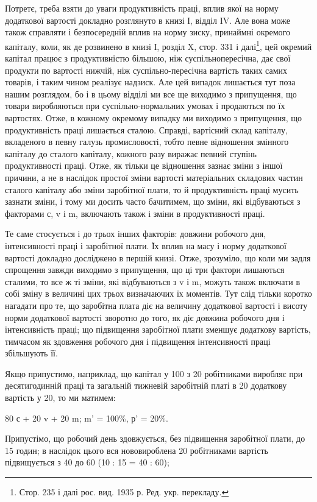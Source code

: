 Потретє, треба взяти до уваги продуктивність праці, вплив
якої на норму додаткової вартості докладно розглянуто в книзі І,
відділ IV. Але вона може також справляти і безпосередній
вплив на норму зиску, принаймні окремого капіталу, коли, як
де розвинено в книзі І, розділ X, стор. 331 і далі\footnote*{
Стор. 235 і далі рос. вид. 1935 р. Ред. укр. перекладу.
}, цей окремий
капітал працює з продуктивністю більшою, ніж суспільнопересічна,
дає свої продукти по вартості нижчій, ніж суспільно-пересічна
вартість таких самих товарів, і таким чином
реалізує надзиск. Але цей випадок лишається тут поза нашим
розглядом, бо і в цьому відділі ми все ще виходимо з припущення,
що товари виробляються при суспільно-нормальних
умовах і продаються по їх вартостях. Отже, в кожному окремому
випадку ми виходимо з припущення, що продуктивність
праці лишається сталою. Справді, вартісний склад капіталу,
вкладеного в певну галузь промисловості, тобто певне відношення
змінного капіталу до сталого капіталу, кожного разу
виражає певний ступінь продуктивності праці. Отже, як тільки
це відношення зазнає зміни з іншої причини, а не в наслідок
простої зміни вартості матеріальних складових частин сталого
капіталу або зміни заробітної плати, то й продуктивність праці
мусить зазнати зміни, і тому ми досить часто бачитимем, що
зміни, які відбуваються з факторами с, v і m, включають також
і зміни в продуктивності праці.

Те саме стосується і до трьох інших факторів: довжини робочого
дня, інтенсивності праці і заробітної плати. Їх вплив
на масу і норму додаткової вартості докладно досліджено в першій
книзі. Отже, зрозуміло, що коли ми задля спрощення завжди
виходимо з припущення, що ці три фактори лишаються сталими,
то все ж ті зміни, які відбуваються з v і m, можуть також включати
в собі зміну в величині цих трьох визначаючих їх моментів.
Тут слід тільки коротко нагадати про те, що заробітна плата
діє на величину додаткової вартості і висоту норми додаткової
вартості зворотно до того, як діє довжина робочого дня і інтенсивність
праці; що підвищення заробітної плати зменшує додаткову
вартість, тимчасом як здовження робочого дня і підвищення
інтенсивності праці збільшують її.

Якщо припустимо, наприклад, що капітал у 100 з 20 робітниками
виробляє при десятигодинній праці та загальній тижневій
заробітній платі в 20 додаткову вартість у 20, то ми
матимем:

80 с + 20 v + 20 m; m' = 100\%, р' = 20\%.

Припустімо, що робочий день здовжується, без підвищення
заробітної плати, до 15 годин; в наслідок цього вся нововироблена
20 робітниками вартість підвищується з 40 до 60 (10 : 15 = 40 : 60);